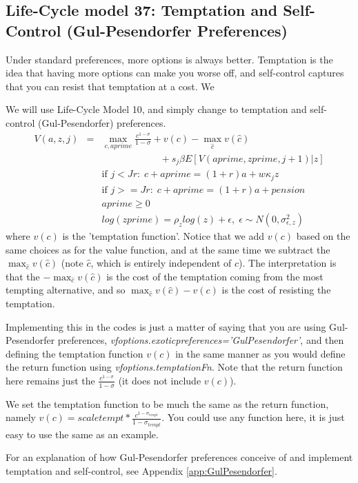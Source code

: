 \subsection{Life-Cycle model 37: Temptation and Self-Control (Gul-Pesendorfer Preferences)}
Under standard preferences, more options is always better. Temptation is the idea that having more options can make you worse off, and self-control captures that you can resist that temptation at a cost. We

We will use Life-Cycle Model 10, and simply change to temptation and self-control (Gul-Pesendorfer) preferences.
\begin{eqnarray*}
 V(a,z,j)&=& \max_{c,aprime} \frac{c^{1-\sigma}}{1-\sigma} + v(c) -\max_{\hat{c}} v(\hat{c}) \\
 && \quad \quad \quad \quad \quad \quad   + s_j \beta E[V(aprime,zprime,j+1)|z]\\
&& \text{if }j<Jr: \; c+aprime=(1+r)a+w \kappa_j z\\
&& \text{if }j>=Jr: \; c+aprime=(1+r)a +pension\\
&& aprime\geq 0 \\
&& log(zprime)=\rho_z log(z) + \epsilon, \; \epsilon \sim N(0,\sigma_{\epsilon,z}^2)
\end{eqnarray*}
where $v(c)$ is the 'temptation function'. Notice that we add $v(c)$ based on the same choices as for the value function, and at the same time we subtract the $\max_{\hat{c}} v(\hat{c})$ (note $\hat{c}$, which is entirely independent of $c$). The interpretation is that the $-\max_{\hat{c}} v(\hat{c})$ is the cost of the temptation coming from the most tempting alternative, and so $\max_{\hat{c}} v(\hat{c})-v(c)$ is the cost of resisting the temptation.

Implementing this in the codes is just a matter of saying that you are using Gul-Pesendorfer preferences, \textit{vfoptions.exoticpreferences='GulPesendorfer'}, and then defining the temptation function $v(c)$ in the same manner as you would define the return function using \textit{vfoptions.temptationFn}. Note that the return function here remains just the $\frac{c^{1-\sigma}}{1-\sigma}$ (it does not include $v(c)$).

We set the temptation function to be much the same as the return function, namely $v(c)=scaletempt*\frac{c^{1-\sigma_{tempt}}}{1-\sigma_{tempt}}$. You could use any function here, it is just easy to use the same as an example.

For an explanation of how Gul-Pesendorfer preferences conceive of and implement temptation and self-control, see Appendix \ref{app:GulPesendorfer}.

